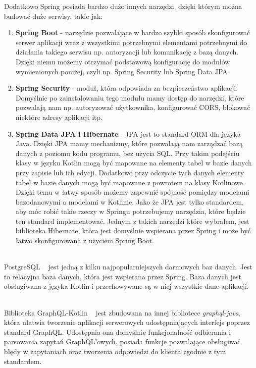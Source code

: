 \begin{description}[leftmargin={15pt},labelindent={0pt}]
    Dodatkowo Spring posiada bardzo dużo innych narzędzi, dzięki którym można budować duże serwisy, takie jak:
    \begin{enumerate}
      \item \textbf{Spring Boot} - narzędzie pozwalające w bardzo szybki sposób skonfigurować serwer aplikacji wraz z wszystkimi potrzebnymi elementami potrzebnymi do działania takiego serwisu np. autoryzacji lub komunikację z bazą danych. Dzięki niemu możemy otrzymać podstawową konfigurację do modułów wymienionych poniżej, czyli np. Spring Security lub Spring Data JPA
      \item \textbf{Spring Security} - moduł, która odpowiada za bezpieczeństwo aplikacji. Domyślnie po zainstalowaniu tego modułu mamy dostęp do narzędzi, które pozwalają nam np. autoryzować użytkownika, konfigurować CORS, blokować niektóre adresy aplikacji itp.
      \item \textbf{Spring Data JPA i Hibernate} - JPA jest to standard ORM dla języka Java. Dzięki JPA mamy mechanizmy, które pozwalają nam zarządzać bazą danych z poziomu kodu programu, bez użycia SQL. Przy takim podejściu klasy w języku Kotlin mogą być mapowane na elementy tabel w bazie danych przy zapisie lub ich edycji. Dodatkowo przy odczycie tych danych elementy tabel w bazie danych mogą być mapowane z powrotem na klasy Kotlinowe. Dzięki temu w łatwy sposób możemy zapewnić spójność pomiędzy modelami bazodanowymi a modelami w Kotlinie. Jako że JPA jest tylko standardem, aby móc robić takie rzeczy w Springu potrzebujemy narzędzia, które będzie ten standard implementować. Jednym z takich narzędzi które wybrałem, jest biblioteka Hibernate, która jest domyślnie wspierana przez Spring i może być łatwo skonfigurowana z użyciem Spring Boot.
    \end{enumerate}


  \vspace{0.4cm}

  \item[PostgreSQL] \hfill \\ PostgreSQL ~\cite{ref_postgre_doc} jest jedną z kilku najpopularniejszych darmowych baz danych. Jest to relacyjna baza danych, która jest wspierana przez Spring. Baza danych jest obsługiwana z języka Kotlin i przechowywane są w niej wszystkie dane aplikacji.

  \vspace{0.4cm}

  \item[GraphQL-Kotlin] \hfill \\ Biblioteka GraphQL-Kotlin ~\cite{ref_gqlKotlin_doc} jest zbudowana na innej bibliotece \emph{graphql-java}, która ułatwia tworzenie aplikacji serwerowych udostępniających interfejs poprzez standard GraphQL. Udostępnia ona domyślnie funkcjonalność odbierania i parsowania zapytań GraphQL'owych, posiada funkcje pozwalające obsługiwać błędy w zapytaniach oraz tworzenia odpowiedzi do klienta zgodnie z tym standardem.
\end{description}


